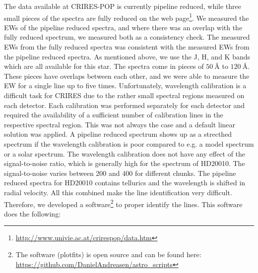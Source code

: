 \documentclass{aa}
\begin{document}
The data available at CRIRES-POP is currently pipeline reduced,
while three small pieces of the spectra are fully reduced on the web
page\footnote{\url{http://www.univie.ac.at/crirespop/data.htm}}.
We measured the EWs of the pipeline reduced spectra, and where
there was an overlap with the fully reduced spectrum, we measured both
as a consistency check. The measured EWs from the fully reduced spectra
was consistent with the measured EWs from the pipeline reduced
spectra. As mentioned above, we use the J, H, and K bands which
are all available for this star. The spectra come in pieces of
$\SI{50}{\angstrom}$ to $\SI{120}{\angstrom}$. These pieces have
overlaps between each other, and we were able to measure the EW for a
single line up to five times. Unfortunately, wavelength calibration
is a difficult task for CRIRES due to the rather small spectral
regions measured on each detector. Each calibration was performed
separately for each detector and required the availability of a
sufficient number of calibration lines in the respective spectral
region. This was not always the case and a default linear solution
was applied. A pipeline reduced spectrum shows up as a strecthed
spectrum if the wavelength calibration is poor compared to e.g.
a model spectrum or a solar spectrum. The wavelength calibration does
not have any effect of the signal-to-noise ratio, which is generally high
for the spectrum of HD20010. The signal-to-noise varies between 200 and
400 for different chunks. The pipeline
reduced spectra for HD20010 contains tellurics and the wavelength
is shifted in radial velocity. All this combined make the line identification very
difficult. Therefore, we developed a software\footnote{The software
(plot\textunderscore{}fits) is open source and can be found here:
\url{https://github.com/DanielAndreasen/astro_scripts}} to proper identify the
lines. This software does the following:
\end{document}
